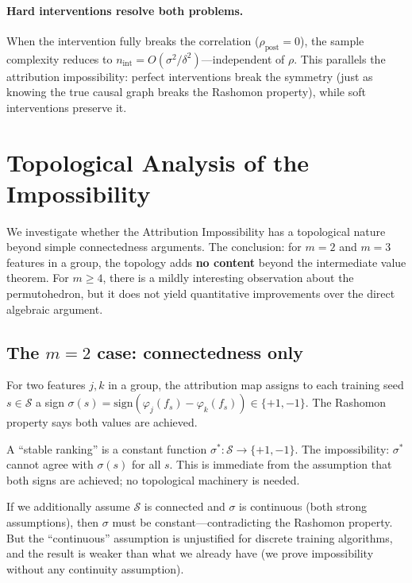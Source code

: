\documentclass{article}
\begin{document}
\paragraph{Hard interventions resolve both problems.}
When the intervention fully breaks the correlation
($\rho_{\mathrm{post}} = 0$), the sample complexity reduces to
$n_{\mathrm{int}} = O(\sigma^2/\delta^2)$---independent of $\rho$.
This parallels the attribution impossibility: perfect interventions
break the symmetry (just as knowing the true causal graph breaks
the Rashomon property), while soft interventions preserve it.


\section{Topological Analysis of the Impossibility}
\label{sec:topological}

We investigate whether the Attribution Impossibility has a
topological nature beyond simple connectedness arguments.
The conclusion: for $m = 2$ and $m = 3$ features in a group,
the topology adds \textbf{no content} beyond the intermediate
value theorem. For $m \geq 4$, there is a mildly interesting
observation about the permutohedron, but it does not yield
quantitative improvements over the direct algebraic argument.

\subsection{The $m = 2$ case: connectedness only}

For two features $j, k$ in a group, the attribution map assigns
to each training seed $s \in \mathcal{S}$ a sign
$\sigma(s) = \mathrm{sign}(\varphi_j(f_s) - \varphi_k(f_s)) \in \{+1, -1\}$.
The Rashomon property says both values are achieved.

A ``stable ranking'' is a constant function
$\sigma^* \colon \mathcal{S} \to \{+1, -1\}$.
The impossibility: $\sigma^*$ cannot agree with $\sigma(s)$ for
all $s$. This is immediate from the assumption that both signs
are achieved; no topological machinery is needed.

If we additionally assume $\mathcal{S}$ is connected and $\sigma$
is continuous (both strong assumptions), then $\sigma$ must be
constant---contradicting the Rashomon property. But the
``continuous'' assumption is unjustified for discrete training
algorithms, and the result is weaker than what we already have
(we prove impossibility without any continuity assumption).
\end{document}
